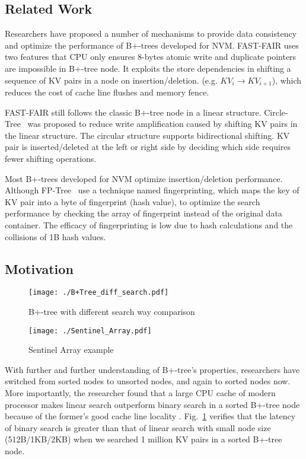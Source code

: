 \subsection{Related Work}

Researchers have proposed a number of mechanisms to provide data consistency and optimize the performance of B+-trees developed for NVM. \textsf{FAST-FAIR} \cite{hwang2018endurable} uses two features that CPU only ensures 8-bytes atomic write and duplicate pointers are impossible in B+-tree node. It exploits the store dependencies in shifting a sequence of KV pairs in a node on insertion/deletion. (e.g. $KV_{i} \xrightarrow{} KV_{i+1}$), which reduces the cost of cache line flushes and memory fence. 

\textsf{FAST-FAIR} still follows the classic B+-tree node in a linear structure. \textsf{Circle-Tree}~\cite{wang2019circ} was proposed to reduce write amplification caused by shifting KV pairs in the linear structure. The circular structure supports bidirectional shifting. KV pair is inserted/deleted at the left or right side by deciding which side requires fewer shifting operations. 

Most B+-trees developed for NVM optimize insertion/deletion performance. Although \textsf{FP-Tree}~\cite{oukid2016fptree} use a technique named fingerprinting, which maps the key of KV pair into a byte of fingerprint (hash value), to optimize the search performance by checking the array of fingerprint instead of the original data container. The efficacy of fingerprinting is low due to hash calculations and the collisions of 1B hash values. 

\subsection{Motivation}

\begin{figure}[htbp]
\centerline{\texttt{[image: ./B+Tree\_diff\_search.pdf]}}
\caption{B+-tree with different search way comparison}
\label{L_B_Comparison}
\end{figure}

\begin{figure}[htbp]
\centerline{\texttt{[image: ./Sentinel\_Array.pdf]}}
\caption{Sentinel Array example}
\label{fig1}
\end{figure}

With further and further understanding of B+-tree's properties, researchers have switched from sorted nodes to unsorted nodes, and again to sorted nodes now. More importantly, the researcher found that a large CPU cache of modern processor makes linear search outperform binary search in a sorted B+-tree node because of the former's good cache line locality \cite{danowitz2012cpu}. Fig.~\ref{L_B_Comparison} verifies that the latency of binary search is greater than that of linear search with small node size (512B/1KB/2KB) when we searched 1 million KV pairs in a sorted B+-tree node. 

